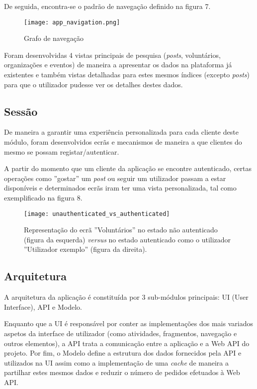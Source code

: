 \bigskip

De seguida, encontra-se o padrão de navegação definido na figura 7.

\newpage

\begin{figure}[h]
	\centering
	\texttt{[image: app\_navigation.png]}
	\caption{Grafo de navegação}
\end{figure}

Foram desenvolvidas 4 vistas principais de pesquisa (\textit{posts}, voluntários, organizações e eventos) de maneira a apresentar os dados na plataforma já existentes e também vistas detalhadas para estes mesmos índices (excepto \textit{posts}) para que o utilizador pudesse ver os detalhes destes dados.

\bigskip

\subsection{Sessão}

De maneira a garantir uma experiência personalizada para cada cliente deste módulo, foram desenvolvidos ecrãs e mecanismos de maneira a que clientes do mesmo se possam registar/autenticar.

\bigskip

A partir do momento que um cliente da aplicação se encontre autenticado, certas operações como ''gostar'' um \textit{post} ou seguir um utilizador passam a estar disponíveis e determinados ecrãs iram ter uma vista personalizada, tal como exemplificado na figura 8.

\newpage

\begin{figure}[h]
	\centering
	\texttt{[image: unauthenticated\_vs\_authenticated]}
	\caption{Representação do ecrã ''Voluntários'' no estado não autenticado (figura da esquerda) \textit{versus} no estado autenticado como o utilizador ''Utilizador exemplo'' (figura da direita).}
\end{figure}

\subsection{Arquitetura}

A arquitetura da aplicação é constituída por 3 sub-módulos principais: UI (User Interface), API e Modelo.

\medskip

Enquanto que a UI é responsável por conter as implementações dos mais variados aspetos da interface de utilizador (como atividades, fragmentos, navegação e outros elementos), a API trata a comunicação entre a aplicação e a Web API do projeto. Por fim, o Modelo define a estrutura dos dados fornecidos pela API e utilizados na UI assim como a implementação de uma \textit{cache} de maneira a partilhar estes mesmos dados e reduzir o número de pedidos efetuados à Web API.

